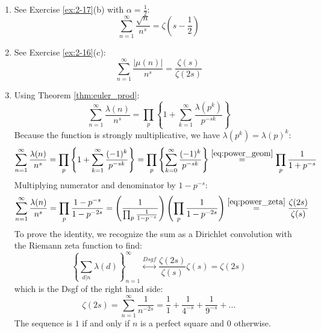 \begin{solution}
    \begin{enumerate}[label=(\alph*)]
        \item See Exercise \ref{ex:2-17}(b) with $\alpha = \frac{1}{2}$:
        \[
            \sum_{n=1}^\infty \frac{\sqrt{n}}{n^s} = \zeta\left(s-\frac{1}{2}\right)
        \]
        \item See Exercise \ref{ex:2-16}(c):
        \[
            \sum_{n=1}^\infty \frac{|\mu(n)|}{n^s} = \frac{\zeta(s)}{\zeta(2s)}
        \]
        \item Using Theorem \ref{thm:euler_prod}:
        \[
            \sum_{n=1}^\infty \frac{\lambda(n)}{n^s} = \prod_p \left\{1 + \sum_{k=1}^\infty \frac{\lambda(p^k)}{p^{-sk}} \right\}
        \]
        Because the function is strongly multiplicative, we have $\lambda(p^k) = \lambda(p)^k$:
        \[
            \sum_{n=1}^\infty \frac{\lambda(n)}{n^s} = \prod_p \left\{1 + \sum_{k=1}^\infty \frac{(-1)^k}{p^{-sk}} \right\} = \prod_p \left\{\sum_{k=0}^\infty \frac{(-1)^k}{p^{-sk}} \right\} \overset{\eqref{eq:power_geom}}{=} \prod_p \frac{1}{1 + p^{-s}}
        \]
        Multiplying numerator and denominator by $1-p^{-s}$:
        \begin{align*}
            \sum_{n=1}^\infty \frac{\lambda(n)}{n^s} &= \prod_p \frac{1 - p^{-s}}{1 - p^{-2s}} = \left(\frac{1}{\prod_p \frac{1}{1-p^{-s}}}\right)\left(\prod_p \frac{1}{1-p^{-2s}}\right) \overset{\eqref{eq:power_zeta}}{=} \frac{\zeta(2s)}{\zeta(s)}
        \end{align*}
        To prove the identity, we recognize the sum as a Dirichlet convolution with the Riemann zeta function to find:
        \[
            \left\{ \sum_{d\vert n}\lambda(d) \right\}_{n=1}^\infty \stackrel{Dsgf}{\longleftrightarrow} \frac{\zeta(2s)}{\zeta(s)} \zeta(s) = \zeta(2s)
        \]
        which is the Dsgf of the right hand side:
        \[
            \zeta(2s) = \sum_{n=1}^\infty \frac{1}{n^{-2s}} = \frac{1}{1} + \frac{1}{4^{-s}} + \frac{1}{9^{-s}} + \ldots
        \]
        The sequence is $1$ if and only if $n$ is a perfect square and $0$ otherwise.
    \end{enumerate}
\end{solution}

